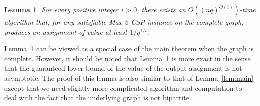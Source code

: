 \documentclass{article}
\newtheorem{lemma}{Lemma}
\begin{document}
\begin{lemma} \label{lem:approx-complete-game}
  For every positive integer $i > 0$, there exists an $O\left((nq)^{O(i)}\right)$-time algorithm that, for any satisfiable {\sc Max 2-CSP} instance on the complete graph, produces an assignment of value at least $1/q^{1/i}$.
\end{lemma}

Lemma~\ref{lem:approx-complete-game} can be viewed as a special case of the main theorem when the graph is complete. However, it should be noted that Lemma~\ref{lem:approx-complete-game} is more exact in the sense that the guaranteed lower bound of the value of the output assignment is not asymptotic. The proof of this lemma is also similar to that of Lemma~\ref{lem:main} except that we need slightly more complicated algorithm and computation to deal with the fact that the underlying graph is not bipartite.
\end{document}
